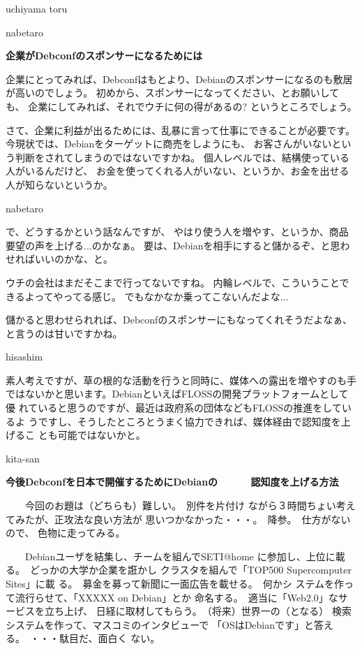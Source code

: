 \documentclass[cjk,dvipdfmx,12pt]{beamer}
\begin{document}
\begin{frame}{uchiyama toru}
\end{frame}\begin{frame}{nabetaro}

\textbf{企業がDebconfのスポンサーになるためには}

企業にとってみれば、Debconfはもとより、Debianのスポンサーになるのも敷居が高いのでしょう。
初めから、スポンサーになってください、とお願いしても、
企業にしてみれば、それでウチに何の得があるの? というところでしょう。

さて、企業に利益が出るためには、乱暴に言って仕事にできることが必要です。
今現状では、Debianをターゲットに商売をしようにも、
お客さんがいないという判断をされてしまうのではないですかね。
個人レベルでは、結構使っている人がいるんだけど、
お金を使ってくれる人がいない、というか、お金を出せる人が知らないというか。

\end{frame}\begin{frame}{nabetaro}

で、どうするかという話なんですが、
やはり使う人を増やす、というか、商品要望の声を上げる...のかなぁ。
要は、Debianを相手にすると儲かるぞ、と思わせればいいのかな、と。

ウチの会社はまだそこまで行ってないですね。
内輪レベルで、こういうことできるよってやってる感じ。
でもなかなか乗ってこないんだよな...

儲かると思わせられれば、Debconfのスポンサーにもなってくれそうだよなぁ、
と言うのは甘いですかね。

\end{frame}\begin{frame}{hisashim}

素人考えですが、草の根的な活動を行うと同時に、媒体への露出を増やすのも手
ではないかと思います。DebianといえばFLOSSの開発プラットフォームとして優
れていると思うのですが、最近は政府系の団体などもFLOSSの推進をしているよ
うですし、そうしたところとうまく協力できれば、媒体経由で認知度を上げるこ
とも可能ではないかと。


\end{frame}\begin{frame}{kita-san}

\textbf{今後Debconfを日本で開催するためにDebianの
　　　認知度を上げる方法}

　　今回のお題は（どちらも）難しい。　別件を片付け
ながら３時間ちょい考えてみたが、正攻法な良い方法が
思いつかなかった・・・。　降参。　仕方がないので、
色物に走ってみる。

　　Debianユーザを結集し、チームを組んでSETI@home
に参加し、上位に載る。　どっかの大学か企業を誑かし
クラスタを組んで「TOP500 Supercomputer Sites」に載
る。　募金を募って新聞に一面広告を載せる。　何かシ
ステムを作って流行らせて、「XXXXX on Debian」とか
命名する。　適当に「Web2.0」なサービスを立ち上げ、
日経に取材してもらう。　（将来）世界一の（となる）
検索システムを作って、マスコミのインタビューで
「OSはDebianです」と答える。　・・・駄目だ、面白く
ない。


\end{frame}
\end{document}
